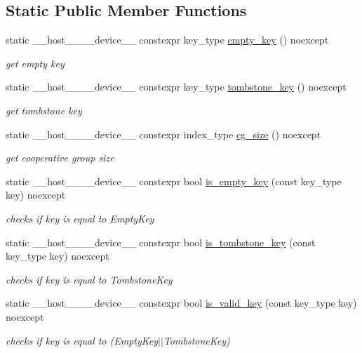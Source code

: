 \subsection*{Static Public Member Functions}
\begin{DoxyCompactItemize}
\item 
static \+\_\+\+\_\+host\+\_\+\+\_\+\+\_\+\+\_\+device\+\_\+\+\_\+ constexpr key\+\_\+type \hyperlink{classwarpcore_1_1SingleValueHashTable_add0eb4b5b495e044affce46b8cb11021}{empty\+\_\+key} () noexcept
\begin{DoxyCompactList}\small\item\em get empty key \end{DoxyCompactList}\item 
static \+\_\+\+\_\+host\+\_\+\+\_\+\+\_\+\+\_\+device\+\_\+\+\_\+ constexpr key\+\_\+type \hyperlink{classwarpcore_1_1SingleValueHashTable_afd4fb9761ef0fd1a497a9cff5f5bd52e}{tombstone\+\_\+key} () noexcept
\begin{DoxyCompactList}\small\item\em get tombstone key \end{DoxyCompactList}\item 
static \+\_\+\+\_\+host\+\_\+\+\_\+\+\_\+\+\_\+device\+\_\+\+\_\+ constexpr index\+\_\+type \hyperlink{classwarpcore_1_1SingleValueHashTable_aaa4cf7e3252a0b177101fca437e5309e}{cg\+\_\+size} () noexcept
\begin{DoxyCompactList}\small\item\em get cooperative group size \end{DoxyCompactList}\item 
static \+\_\+\+\_\+host\+\_\+\+\_\+\+\_\+\+\_\+device\+\_\+\+\_\+ constexpr bool \hyperlink{classwarpcore_1_1SingleValueHashTable_af74c58b98cbc197243f98940ee0b1baa}{is\+\_\+empty\+\_\+key} (const key\+\_\+type key) noexcept
\begin{DoxyCompactList}\small\item\em checks if {\ttfamily key} is equal to {\ttfamily Empty\+Key} \end{DoxyCompactList}\item 
static \+\_\+\+\_\+host\+\_\+\+\_\+\+\_\+\+\_\+device\+\_\+\+\_\+ constexpr bool \hyperlink{classwarpcore_1_1SingleValueHashTable_a38a217e5b08eeab46539501b1cd2a082}{is\+\_\+tombstone\+\_\+key} (const key\+\_\+type key) noexcept
\begin{DoxyCompactList}\small\item\em checks if {\ttfamily key} is equal to {\ttfamily Tombstone\+Key} \end{DoxyCompactList}\item 
static \+\_\+\+\_\+host\+\_\+\+\_\+\+\_\+\+\_\+device\+\_\+\+\_\+ constexpr bool \hyperlink{classwarpcore_1_1SingleValueHashTable_a46cd1b240746021179983e3263f427b5}{is\+\_\+valid\+\_\+key} (const key\+\_\+type key) noexcept
\begin{DoxyCompactList}\small\item\em checks if {\ttfamily key} is equal to {\ttfamily }(Empty\+Key$\vert$$\vert$\+Tombstone\+Key) \end{DoxyCompactList}\end{DoxyCompactItemize}
